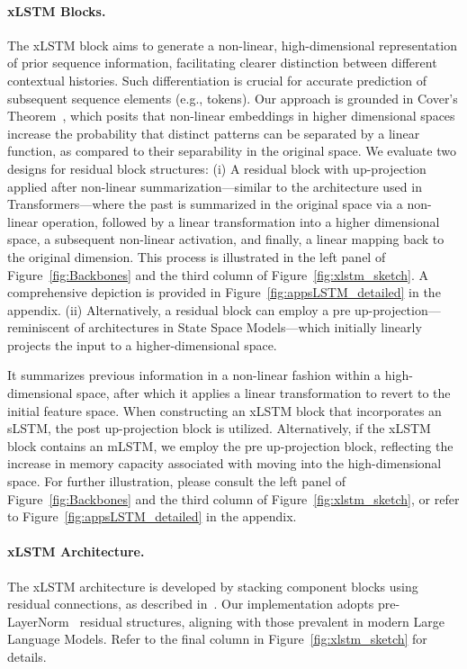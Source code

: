 \paragraph{xLSTM Blocks.}
\label{sec:xLSTMblock}
The xLSTM block aims to generate a non-linear, high-dimensional representation of prior sequence information, facilitating clearer distinction between different contextual histories. Such differentiation is crucial for accurate prediction of subsequent sequence elements (e.g., tokens). Our approach is grounded in Cover’s Theorem~\citep{Cover:65}, which posits that non-linear embeddings in higher dimensional spaces increase the probability that distinct patterns can be separated by a linear function, as compared to their separability in the original space. We evaluate two designs for residual block structures: (i) A residual block with up-projection applied after non-linear summarization—similar to the architecture used in Transformers—where the past is summarized in the original space via a non-linear operation, followed by a linear transformation into a higher dimensional space, a subsequent non-linear activation, and finally, a linear mapping back to the original dimension. This process is illustrated in the left panel of Figure~\ref{fig:Backbones} and the third column of Figure~\ref{fig:xlstm_sketch}. A comprehensive depiction is provided in Figure~\ref{fig:appsLSTM_detailed} in the appendix. (ii) Alternatively, a residual block can employ a pre up-projection—reminiscent of architectures in State Space Models—which initially linearly projects the input to a higher-dimensional space.

It summarizes previous information in a non-linear fashion within a high-dimensional space, after which it applies a linear transformation to revert to the initial feature space. When constructing an xLSTM block that incorporates an sLSTM, the post up-projection block is utilized. Alternatively, if the xLSTM block contains an mLSTM, we employ the pre up-projection block, reflecting the increase in memory capacity associated with moving into the high-dimensional space. For further illustration, please consult the left panel of Figure~\ref{fig:Backbones} and the third column of Figure~\ref{fig:xlstm_sketch}, or refer to Figure~\ref{fig:appsLSTM_detailed} in the appendix.

\paragraph{xLSTM Architecture. }
\label{sec:xLSTMarchitecure}
The xLSTM architecture is developed by stacking component blocks using residual connections, as described in~\citep{Srivastava:15,He:16}. Our implementation adopts pre-LayerNorm~\citep{Ba:16b} residual structures, aligning with those prevalent in modern Large Language Models. Refer to the final column in Figure~\ref{fig:xlstm_sketch} for details.

